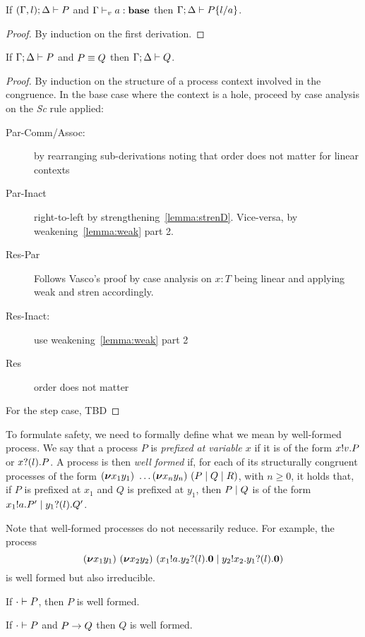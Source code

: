 \begin{lemma}[Substitution]\mbox{}
  If $(\Gamma, l);\Delta \vdash P$ and ${\Gamma \vdash_v a : \mathbf{base}}$ then
  \( \Gamma;\Delta \vdash P\{l/a\} \).
\end{lemma}
\begin{proof}
  By induction on the first derivation.
\end{proof}
\begin{lemma}
  If \( \Gamma;\Delta \vdash P \) and \( P \equiv Q \) then \( \Gamma;\Delta \vdash Q \).
\end{lemma}
\begin{proof}
  By induction on the structure of a process context involved in the congruence. In the base case where the context is a hole, proceed by case analysis on the \textsl{Sc} rule applied:
  \begin{description}
  \item[Par-Comm/Assoc:] by rearranging sub-derivations noting that
    order does not matter for linear contexts
  \item[Par-Inact] right-to-left by
    strengthening~\ref{lemma:strenD}. Vice-versa, by weakening~\ref{lemma:weak} part 2.
  \item[Res-Par] Follows Vasco's proof by case analysis on $x : T$ being linear and applying weak and stren accordingly.
  \item[Res-Inact:] use weakening~\ref{lemma:weak} part 2
  \item[Res] order does not matter
  \end{description}
  For the step case, TBD
\end{proof}

To formulate safety, we need to formally define what we mean by well-formed process.
We say that a process \( P \) is \emph{prefixed at variable \( x \)} if it is of the form \( x ! v . P \) or \( x ? (l) . P \).
A process is then \emph{well formed} if, for each of its structurally congruent processes of the form \( (\bm{\nu} x_1y_1)~\dots (\bm{\nu} x_ny_n)~(P \mid Q \mid R) \), with \( n \geq 0 \), it holds that, if \( P \) is prefixed at \( x_1 \) and \( Q \) is prefixed at \( y_1 \), then \( P \mid Q \) is of the form \( x_1 ! a . P' \mid y_1 ? (l) . Q' \).

Note that well-formed processes do not necessarily reduce. For example, the process
\begin{equation*}
  (\bm{\nu} x_1y_1)~(\bm{\nu} x_2y_2)~(x_1 ! a . y_2 ? (l) . \bm{0} \mid y_2 ! x_2 . y_1 ? (l) . \bm{0})
\end{equation*}
is well formed but also irreducible.

\begin{theorem}
  If \( \cdot \vdash P \), then \( P \) is well formed.
\end{theorem}

\begin{corollary}
  If \( \cdot \vdash P \) and \( P \rightarrow Q \) then \( Q \) is well formed.
\end{corollary}